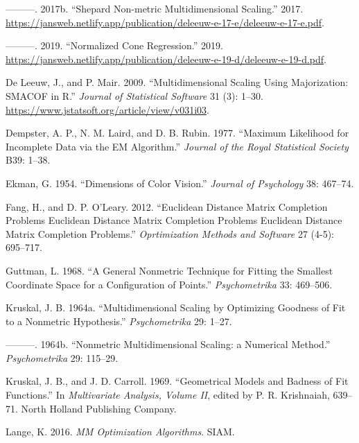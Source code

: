 \documentclass[
  12pt,
]{article}
\newlength{\cslhangindent}
\newenvironment{CSLReferences}[2] %
 {\begin{list}{}{%
  \setlength{\itemindent}{0pt}
  \setlength{\leftmargin}{0pt}
  \setlength{\parsep}{0pt}
  \ifodd #1
   \setlength{\leftmargin}{\cslhangindent}
   \setlength{\itemindent}{-1\cslhangindent}
  \fi
  \setlength{\itemsep}{#2\baselineskip}}}
 {\end{list}}
\begin{document}
\begin{CSLReferences}{1}{0}
---------. 2017b. {``{Shepard Non-metric Multidimensional Scaling}.''} 2017. \url{https://jansweb.netlify.app/publication/deleeuw-e-17-e/deleeuw-e-17-e.pdf}.

---------. 2019. {``Normalized Cone Regression.''} 2019. \url{https://jansweb.netlify.app/publication/deleeuw-e-19-d/deleeuw-e-19-d.pdf}.

De Leeuw, J., and P. Mair. 2009. {``{Multidimensional Scaling Using Majorization: SMACOF in R}.''} \emph{Journal of Statistical Software} 31 (3): 1--30. \url{https://www.jstatsoft.org/article/view/v031i03}.

Dempster, A. P., N. M. Laird, and D. B. Rubin. 1977. {``{Maximum Likelihood for Incomplete Data via the EM Algorithm}.''} \emph{Journal of the Royal Statistical Society} B39: 1--38.

Ekman, G. 1954. {``{Dimensions of Color Vision}.''} \emph{Journal of Psychology} 38: 467--74.

Fang, H., and D. P. O'Leary. 2012. {``Euclidean Distance Matrix Completion Problems Euclidean Distance Matrix Completion Problems Euclidean Distance Matrix Completion Problems.''} \emph{Oprtimization Methods and Software} 27 (4-5): 695--717.

Guttman, L. 1968. {``{A General Nonmetric Technique for Fitting the Smallest Coordinate Space for a Configuration of Points}.''} \emph{Psychometrika} 33: 469--506.

Kruskal, J. B. 1964a. {``{Multidimensional Scaling by Optimizing Goodness of Fit to a Nonmetric Hypothesis}.''} \emph{Psychometrika} 29: 1--27.

---------. 1964b. {``{Nonmetric Multidimensional Scaling: a Numerical Method}.''} \emph{Psychometrika} 29: 115--29.

Kruskal, J. B., and J. D. Carroll. 1969. {``{Geometrical Models and Badness of Fit Functions}.''} In \emph{Multivariate Analysis, Volume II}, edited by P. R. Krishnaiah, 639--71. North Holland Publishing Company.

Lange, K. 2016. \emph{MM Optimization Algorithms}. SIAM.


\end{CSLReferences}
\end{document}

